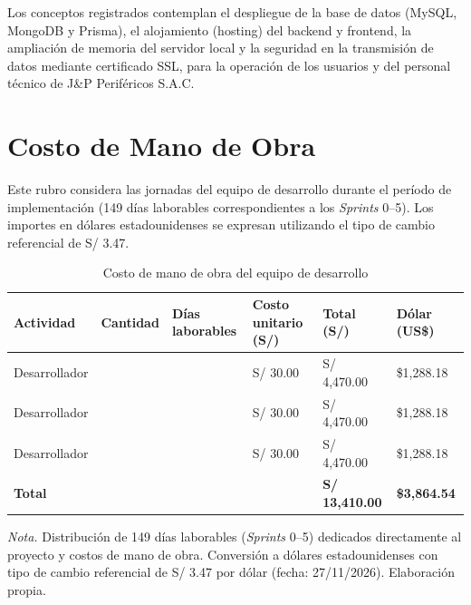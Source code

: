Los conceptos registrados contemplan el despliegue de la base de datos (MySQL, MongoDB y Prisma), el alojamiento (hosting) del backend y frontend, la ampliación de memoria del servidor local y la seguridad en la transmisión de datos mediante certificado SSL, para la operación de los usuarios y del personal técnico de J\&P Periféricos S.A.C.

\section{Costo de Mano de Obra}

Este rubro considera las jornadas del equipo de desarrollo durante el período de implementación (149 días laborables correspondientes a los \textit{Sprints} 0--5). Los importes en dólares estadounidenses se expresan utilizando el tipo de cambio referencial de S/ 3.47.

\begin{table}[htbp]
\centering
\caption{Costo de mano de obra del equipo de desarrollo}
\label{tab:costo_mano_obra}
\begin{tabularx}{\textwidth}{@{}>{\raggedright\arraybackslash}X >{\centering\arraybackslash}p{1.6cm} >{\centering\arraybackslash}p{2.2cm} >{\raggedleft\arraybackslash}p{2.3cm} >{\raggedleft\arraybackslash}p{2.2cm} >{\raggedleft\arraybackslash}p{2.1cm}@{}}
\toprule
\textbf{Actividad} & \textbf{Cantidad} & \textbf{Días laborables} & \textbf{Costo unitario (S/)} & \textbf{Total (S/)} & \textbf{Dólar (US\$)} \\
\midrule
Desarrollador & 1 & 149 & S/ 30.00 & S/ 4,470.00 & \$1,288.18 \\
Desarrollador & 1 & 149 & S/ 30.00 & S/ 4,470.00 & \$1,288.18 \\
Desarrollador & 1 & 149 & S/ 30.00 & S/ 4,470.00 & \$1,288.18 \\
\midrule
\textbf{Total} & & & & \textbf{S/ 13,410.00} & \textbf{\$3,864.54} \\
\bottomrule
\end{tabularx}
\par\vspace{0.3em}
\raggedright\footnotesize{\textit{Nota.} Distribución de 149 días laborables (\textit{Sprints} 0--5) dedicados directamente al proyecto y costos de mano de obra. Conversión a dólares estadounidenses con tipo de cambio referencial de S/ 3.47 por dólar (fecha: 27/11/2026). Elaboración propia.}
\end{table}

\leavevmode\strut\par


